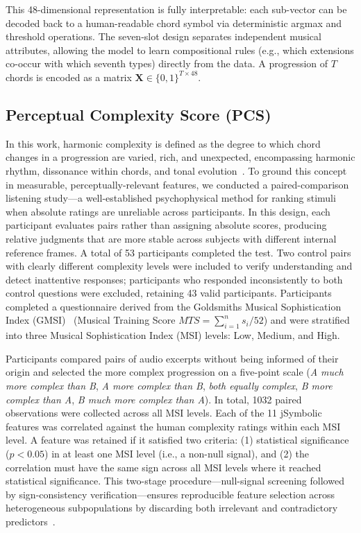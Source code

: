 \documentclass[conference]{IEEEtran}
\begin{document}
This 48-dimensional representation is fully interpretable: each sub-vector can be decoded back to a human-readable chord symbol via deterministic argmax and threshold operations. The seven-slot design separates independent musical attributes, allowing the model to learn compositional rules (e.g., which extensions co-occur with which seventh types) directly from the data. A progression of $T$ chords is encoded as a matrix $\mathbf{X} \in \{0,1\}^{T \times 48}$.

\subsection{Perceptual Complexity Score (PCS)}
\label{sec:pcs}

In this work, harmonic complexity is defined as the degree to which chord changes in a progression are varied, rich, and unexpected, encompassing harmonic rhythm, dissonance within chords, and tonal evolution~\cite{rohrmeier2012comparing,temperley2004cognition}. To ground this concept in measurable, perceptually-relevant features, we conducted a paired-comparison listening study---a well-established psychophysical method for ranking stimuli when absolute ratings are unreliable across participants. In this design, each participant evaluates pairs rather than assigning absolute scores, producing relative judgments that are more stable across subjects with different internal reference frames. A total of 53 participants completed the test. Two control pairs with clearly different complexity levels were included to verify understanding and detect inattentive responses; participants who responded inconsistently to both control questions were excluded, retaining 43 valid participants. Participants completed a questionnaire derived from the Goldsmiths Musical Sophistication Index (GMSI)~\cite{mullensiefen2014musicality} (Musical Training Score $MTS = \sum_{i=1}^{n} s_i/52$) and were stratified into three Musical Sophistication Index (MSI) levels: Low, Medium, and High.

Participants compared pairs of audio excerpts without being informed of their origin and selected the more complex progression on a five-point scale (\textit{A much more complex than B}, \textit{A more complex than B}, \textit{both equally complex}, \textit{B more complex than A}, \textit{B much more complex than A}). In total, 1032 paired observations were collected across all MSI levels. Each of the 11 jSymbolic features was correlated against the human complexity ratings within each MSI level. A feature was retained if it satisfied two criteria: (1) statistical significance ($p < 0.05$) in at least one MSI level (i.e., a non-null signal), and (2) the correlation must have the same sign across all MSI levels where it reached statistical significance. This two-stage procedure---null-signal screening followed by sign-consistency verification---ensures reproducible feature selection across heterogeneous subpopulations by discarding both irrelevant and contradictory predictors~\cite{zhao2025reproducible}.
\end{document}
